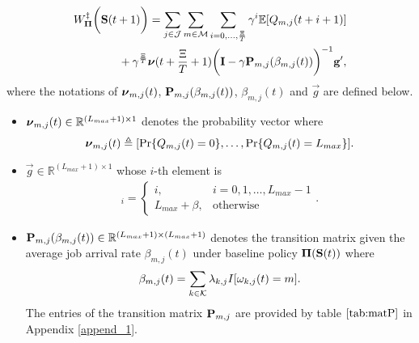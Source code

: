 \begin{lemma}
    {\small
    \begin{align}
        &W^{\ddagger}_{\boldsymbol{\Pi}}\bigg(\mathbf{S}(t+1)\bigg)
        = \sum_{j\in\mathcal{J}}\sum_{m\in\mathcal{M}}\sum_{i=0,\dots,\frac{\Xi}{T}} \gamma^{i} \mathbb{E}[ Q_{m,j}({t+i+1}) ]
        \nonumber\\
        &~~~~~~~~~~~~+ \gamma^{\frac{\Xi}{T}} 
        \boldsymbol{\nu}({t+\frac{\Xi}{T}+1})
        \bigg(
            \mathbf{I} - \gamma \mathbf{P}_{m,j}(\beta_{m,j}(t))
        \bigg)^{-1} \mathbf{g}',
        \label{w_es}
    \end{align}   
    }
    where the notations of $\boldsymbol{\nu}_{m,j}(t)$, $\mathbf{P}_{m,j}(\beta_{m,j}(t))$, $\beta_{m,j}(t)$ and $\vec{g}$ are defined below.
    \begin{itemize}
        \item $\boldsymbol{\nu}_{m,j}(t) \in \mathbb{R}^{(L_{max}+1) \times 1}$ denotes the probability vector where
        \begin{align}
            \boldsymbol{\nu}_{m,j}(t) \triangleq [\Pr\{Q_{m,j}(t)=0\}, \dots, \Pr\{Q_{m,j}(t)=L_{max}\}].
        \end{align}

        \item $\vec{g} \in \mathbb{R}^{(L_{max}+1) \times 1}$ whose $i$-th element is
        \begin{align}
            [\vec{g}]_{i} = 
            \begin{cases}
                i, & i=0,1,\dots,L_{max}-1
                \\
                L_{max}+\beta, & \text{otherwise}
            \end{cases}.
        \end{align}

        \item $\mathbf{P}_{m,j}(\beta_{m,j}(t)) \in \mathbb{R}^{(L_{max}+1) \times (L_{max}+1)}$ denotes the transition matrix given the average job arrival rate $\beta_{m,j}(t)$ under baseline policy $\boldsymbol{\Pi}(\mathbf{S}(t))$ where
        \begin{align}
            \beta_{m,j}(t) = \sum_{k\in\mathcal{K}} \lambda_{k,j} I[\omega_{k,j}(t)=m].
        \end{align}
        The entries of the transition matrix $\mathbf{P}_{m,j}$ are provided by table $\ref{tab:matP}$ in Appendix \ref{append_1}.
    \end{itemize}

\end{lemma}
